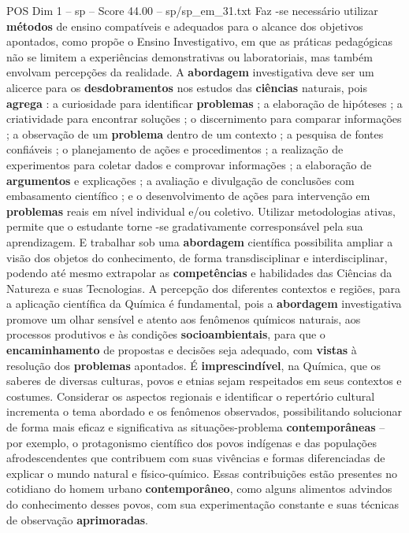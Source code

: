 \begin{textsample}{POS Dim 1 – sp – Score 44.00 – sp/sp\_em\_31.txt}
Faz -se necessário utilizar \textbf{métodos} de ensino compatíveis e adequados para o alcance dos objetivos apontados, como propõe o Ensino Investigativo, em que as práticas pedagógicas não se limitem a experiências demonstrativas ou laboratoriais, mas também envolvam percepções da realidade.
A \textbf{abordagem} investigativa deve ser um alicerce para os \textbf{desdobramentos} nos estudos das \textbf{ciências} naturais, pois \textbf{agrega} : a curiosidade para identificar \textbf{problemas} ; a elaboração de hipóteses ; a criatividade para encontrar soluções ; o discernimento para comparar informações ; a observação de um \textbf{problema} dentro de um contexto ; a pesquisa de fontes confiáveis ; o planejamento de ações e procedimentos ; a realização de experimentos para coletar dados e comprovar informações ; a elaboração de \textbf{argumentos} e explicações ; a avaliação e divulgação de conclusões com embasamento científico ; e o desenvolvimento de ações para intervenção em \textbf{problemas} reais em nível individual e/ou coletivo.
Utilizar metodologias ativas, permite que o estudante torne -se gradativamente corresponsável pela sua aprendizagem.
E trabalhar sob uma \textbf{abordagem} científica possibilita ampliar a visão dos objetos do conhecimento, de forma transdisciplinar e interdisciplinar, podendo até mesmo extrapolar as \textbf{competências} e habilidades das Ciências da Natureza e suas Tecnologias.
A percepção dos diferentes contextos e regiões, para a aplicação científica da Química é fundamental, pois a \textbf{abordagem} investigativa promove um olhar sensível e atento aos fenômenos químicos naturais, aos processos produtivos e às condições \textbf{socioambientais}, para que o \textbf{encaminhamento} de propostas e decisões seja adequado, com \textbf{vistas} à resolução dos \textbf{problemas} apontados.
É \textbf{imprescindível}, na Química, que os saberes de diversas culturas, povos e etnias sejam respeitados em seus contextos e costumes.
Considerar os aspectos regionais e identificar o repertório cultural incrementa o tema abordado e os fenômenos observados, possibilitando solucionar de forma mais eficaz e significativa as situações-problema \textbf{contemporâneas} – por exemplo, o protagonismo científico dos povos indígenas e das populações afrodescendentes que contribuem com suas vivências e formas diferenciadas de explicar o mundo natural e físico-químico.
Essas contribuições estão presentes no cotidiano do homem urbano \textbf{contemporâneo}, como alguns alimentos advindos do conhecimento desses povos, com sua experimentação constante e suas técnicas de observação \textbf{aprimoradas}.

\end{textsample}
